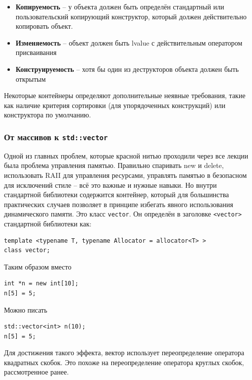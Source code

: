 \documentclass[a4paper,12pt,oneside]{article}
\begin{document}
\begin{itemize}
\item \textbf{Копируемость} -- у объекта должен быть определён стандартный или пользовательский копирующий конструктор, который должен действительно копировать объект.
\item \textbf{Изменяемость} -- объект должен быть lvalue с действительным оператором присваивания
\item \textbf{Конструируемость} -- хотя бы один из деструкторов объекта должен быть открытым
\end{itemize}

Некоторые контейнеры определяют дополнительные неявные требования, такие как наличие критерия сортировки (для упорядоченных конструкций) или конструктора по умолчанию.

\subsubsection{От массивов к \lstinline!std::vector!}\label{vectorarrs}

Одной из главных проблем, которые красной нитью проходили через все лекции была проблема управления памятью. Правильно спаривать new и delete, использовать RAII для управления ресурсами, управлять памятью в безопасном для исключений стиле -- всё это важные и нужные навыки. Но внутри стандартной библиотеки содержится контейнер, который для большинства практических случаев позволяет в принципе избегать явного использования динамического памяти. Это класс \lstinline!vector!. Он определён в заголовке \lstinline!<vector>! стандартной библиотеки как:

\begin{lstlisting}
template <typename T, typename Allocator = allocator<T> >
class vector;
\end{lstlisting}

Таким образом вместо

\begin{lstlisting}
int *n = new int[10];
n[5] = 5;
\end{lstlisting}

Можно писать

\begin{lstlisting}
std::vector<int> n(10);
n[5] = 5;
\end{lstlisting}

Для достижения такого эффекта, вектор использует переопределение оператора квадратных скобок. Это похоже на переопределение оператора круглых скобок, рассмотренное ранее.
\end{document}
